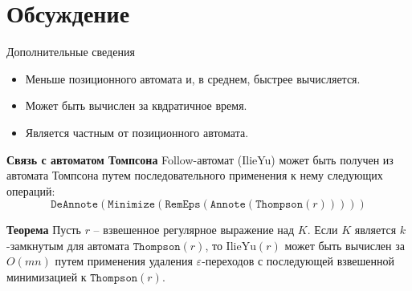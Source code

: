 \documentclass[mathserif]{beamer}
\def\IlieYu{\mathrm{IlieYu}}
\def\Thompson{\mathtt{Thompson}}
\def\RemEps{\mathtt{RemEps}}
\def\DeAnnote{\mathtt{DeAnnote}}
\def\Annote{\mathtt{Annote}}
\def\Minimize{\mathtt{Minimize}}
\newcommand{\empt}{\varepsilon} %
\begin{document}
\section{Обсуждение}
\begin{frame}{Дополнительные сведения}
    \begin{block}{\bf }
        \begin{itemize}
            \item Меньше позиционного автомата и, в среднем, быстрее вычисляется.
            \item Может быть вычислен за квдратичное время.
            \item Является частным от позиционного автомата.
        \end{itemize}
    \end{block}
    \begin{block}{\bf Связь с автоматом Томпсона}
        Follow-автомат (IlieYu) может быть получен из автомата Томпсона путем последовательного применения к нему следующих операций:
        \[\DeAnnote(\Minimize(\RemEps(\Annote(\Thompson(r)))))\] %
    \end{block}
    \begin{block}{\bf Теорема}
        Пусть $r$ -- взвешенное регулярное выражение над $K$. Если $K$ является $k$-замкнутым для автомата $\Thompson(r)$, то $\IlieYu(r)$ может быть вычислен за $O(mn)$ путем применения удаления $\empt$-переходов с последующей взвешенной минимизацией к  $\Thompson(r)$.
    \end{block}
\end{frame}
\end{document}
